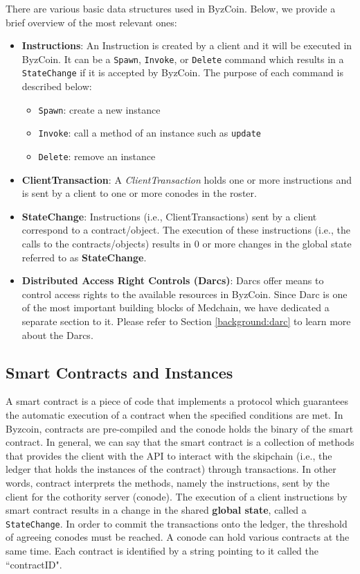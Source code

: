 There are various basic data structures used in ByzCoin. Below, we provide a brief overview of the most relevant ones:
\begin{itemize}
    \item{\textbf{Instructions}}: An Instruction is created by a client and it will be executed in ByzCoin. It can be a \texttt{Spawn}, \texttt{Invoke}, or \texttt{Delete} command which results in a \texttt{StateChange} if it is accepted by ByzCoin. The purpose of each command is described below:
    \begin{itemize}
        \item \texttt{Spawn}: create a new instance
        \item \texttt{Invoke}: call a method of an instance such as \texttt{update}
        \item \texttt{Delete}: remove an instance
    \end{itemize}
    
    \item{\textbf{ClientTransaction}}: A \textit{ClientTransaction} holds one or more instructions and is sent by a client to one or more conodes in the roster. 
    \item{\textbf{StateChange}}: Instructions (i.e., ClientTransactions) sent by a client correspond to a contract/object. The execution of these instructions (i.e., the calls to the contracts/objects) results in 0 or more changes in the global state referred to as \textbf{StateChange}. 
    \item{\textbf{Distributed Access Right Controls (Darcs)}}: Darcs offer means to control access rights to the available resources in ByzCoin. Since Darc is one of the most important building blocks of Medchain, we have dedicated a separate section to it. Please refer to Section \ref{background:darc} to learn more about the Darcs. 

\end{itemize}

\subsection{Smart Contracts and Instances} \label{background:smart_contract}
A smart contract is a piece of code that implements a protocol which guarantees the automatic execution of a contract when the specified conditions are met. In Byzcoin, contracts are pre-compiled and the conode holds the binary of the smart contract. In general, we can say that the smart contract is a collection of methods that provides the client with the API to interact with the skipchain (i.e., the ledger that holds the instances of the contract) through transactions. In other words, contract interprets the methods, namely the instructions, sent by the client for the cothority server (conode). The execution of a client instructions by smart contract results in a change in the shared \textbf{global state}, called a \texttt{StateChange}. In order to commit the transactions onto the ledger, the threshold of agreeing conodes must be reached. A conode can hold various contracts at the same time. Each contract is identified by a string pointing to it called the ``contractID". 


